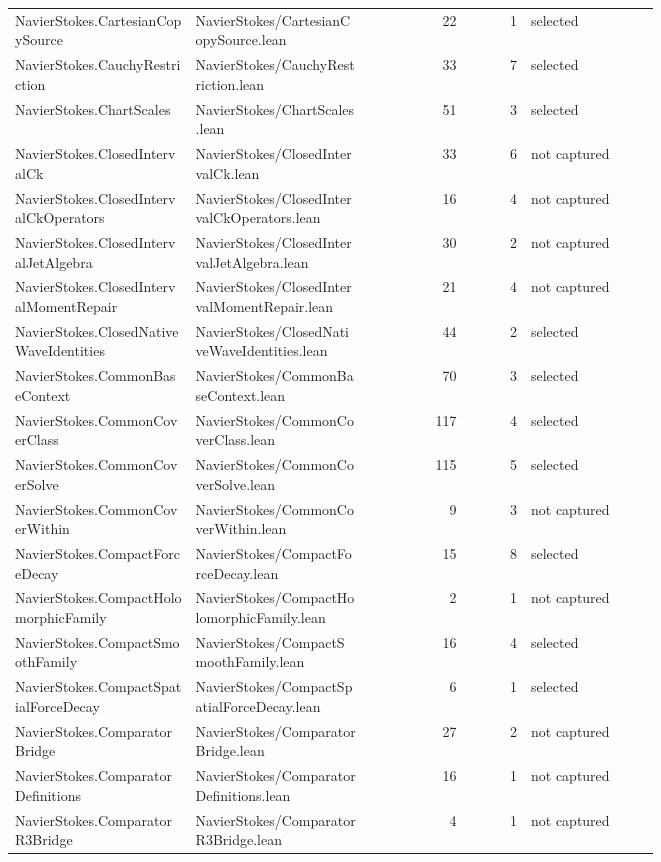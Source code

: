\documentclass[10pt]{article}
\begin{document}
\begin{longtable}{p{0.28\linewidth}p{0.27\linewidth}r r p{0.20\linewidth}}
NavierStokes.CartesianCopySource & NavierStokes/CartesianCopySource.lean & 22 & 1 & selected\\
NavierStokes.CauchyRestriction & NavierStokes/CauchyRestriction.lean & 33 & 7 & selected\\
NavierStokes.ChartScales & NavierStokes/ChartScales.lean & 51 & 3 & selected\\
NavierStokes.ClosedIntervalCk & NavierStokes/ClosedIntervalCk.lean & 33 & 6 & not captured\\
NavierStokes.ClosedIntervalCkOperators & NavierStokes/ClosedIntervalCkOperators.lean & 16 & 4 & not captured\\
NavierStokes.ClosedIntervalJetAlgebra & NavierStokes/ClosedIntervalJetAlgebra.lean & 30 & 2 & not captured\\
NavierStokes.ClosedIntervalMomentRepair & NavierStokes/ClosedIntervalMomentRepair.lean & 21 & 4 & not captured\\
NavierStokes.ClosedNativeWaveIdentities & NavierStokes/ClosedNativeWaveIdentities.lean & 44 & 2 & selected\\
NavierStokes.CommonBaseContext & NavierStokes/CommonBaseContext.lean & 70 & 3 & selected\\
NavierStokes.CommonCoverClass & NavierStokes/CommonCoverClass.lean & 117 & 4 & selected\\
NavierStokes.CommonCoverSolve & NavierStokes/CommonCoverSolve.lean & 115 & 5 & selected\\
NavierStokes.CommonCoverWithin & NavierStokes/CommonCoverWithin.lean & 9 & 3 & not captured\\
NavierStokes.CompactForceDecay & NavierStokes/CompactForceDecay.lean & 15 & 8 & selected\\
NavierStokes.CompactHolomorphicFamily & NavierStokes/CompactHolomorphicFamily.lean & 2 & 1 & not captured\\
NavierStokes.CompactSmoothFamily & NavierStokes/CompactSmoothFamily.lean & 16 & 4 & selected\\
NavierStokes.CompactSpatialForceDecay & NavierStokes/CompactSpatialForceDecay.lean & 6 & 1 & selected\\
NavierStokes.ComparatorBridge & NavierStokes/ComparatorBridge.lean & 27 & 2 & not captured\\
NavierStokes.ComparatorDefinitions & NavierStokes/ComparatorDefinitions.lean & 16 & 1 & not captured\\
NavierStokes.ComparatorR3Bridge & NavierStokes/ComparatorR3Bridge.lean & 4 & 1 & not captured\\

\end{longtable}
\end{document}
